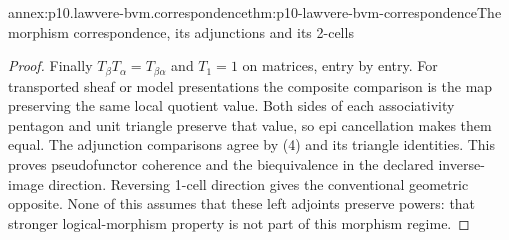 \begin{annexitem}{annex:p10.lawvere-bvm.correspondence}{thm:p10-lawvere-bvm-correspondence}{The morphism correspondence, its adjunctions and its 2-cells}
\begin{proof}
Finally \(T_\beta T_\alpha=T_{\beta\alpha}\) and
\(T_1=1\) on matrices, entry by entry. For transported sheaf or
model presentations the composite comparison is the map preserving
the same local quotient value. Both sides of each associativity
pentagon and unit triangle preserve that value, so epi cancellation
makes them equal. The adjunction comparisons agree by (4) and its
triangle identities. This proves pseudofunctor coherence and the
biequivalence in the declared inverse-image direction. Reversing
1-cell direction gives the conventional geometric opposite. None
of this assumes that these left adjoints preserve powers: that stronger
logical-morphism property is not part of this morphism regime.
\end{proof}
\end{annexitem}
